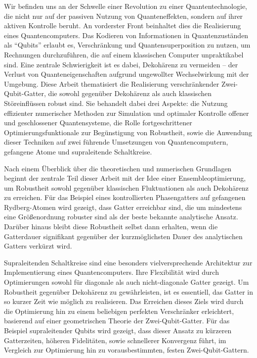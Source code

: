 
Wir befinden uns an der Schwelle einer Revolution zu einer Quantentechnologie,
die nicht nur auf der passiven Nutzung von Quanteneffekten, sondern auf ihrer
aktiven Kontrolle beruht. An vorderster Front beinhaltet dies die Realisierung
eines Quantencomputers. Das Kodieren von Informationen in Quantenzuständen als
``Qubits'' erlaubt es, Verschränkung und Quantensuperposition zu nutzen, um
Rechnungen durchzuführen, die auf einem klassischen Computer unpraktikabel sind.
Eine zentrale Schwierigkeit ist es dabei, Dekohärenz zu vermeiden -- der Verlust
von Quanteneigenschaften aufgrund ungewollter Wechselwirkung mit der Umgebung.
Diese Arbeit thematisiert die Realisierung verschränkender Zwei-Qubit-Gatter,
die sowohl gegenüber Dekohärenz als auch klassischen Störeinflüssen robust sind.
Sie behandelt dabei drei Aspekte: die Nutzung effizienter numerischer Methoden
zur Simulation und optimaler Kontrolle offener und geschlossener
Quantensysteme, die Rolle fortgeschrittener Optimierungsfunktionale zur
Begünstigung von Robustheit, sowie die Anwendung dieser Techniken auf zwei
führende Umsetzungen von Quantencomputern, gefangene Atome und
supraleitende Schaltkreise.

Nach einem Überblick über die theoretischen und numerischen
Grundlagen beginnt der zentrale Teil dieser Arbeit mit der Idee einer
Ensembleoptimierung, um Robustheit sowohl gegenüber klassischen Fluktuationen als
auch Dekohärenz zu erreichen. Für das Beispiel eines kontrollierten
Phasengatters auf gefangenen Rydberg-Atomen wird gezeigt, dass Gatter erreichbar
sind, die um mindestens eine Größenordnung robuster sind als der beste bekannte
analytische Ansatz. Darüber hinaus bleibt diese Ro\/bust\/heit selbst dann
erhalten, wenn die Gatterdauer signifikant gegenüber der kurzmöglichsten Dauer
des analytischen Gatters verkürzt wird.

Supraleitenden Schaltkreise sind eine besonders vielversprechende Architektur
zur Implementierung eines Quantencomputers. Ihre Flexibilität wird durch
Optimierungen sowohl für diagonale als auch nicht-diagonale Gatter gezeigt. Um
Robustheit gegenüber Dekohärenz zu gewährleisten, ist es essentiell, das Gatter
in so kurzer Zeit wie möglich zu realisieren. Das Erreichen dieses Ziels wird
durch die Optimierung hin zu einem beliebigen perfekten Verschränker
erleichtert, basierend auf einer geometrischen Theorie der Zwei-Qubit-Gatter.
Für das Beispiel supraleitender Qubits wird gezeigt, dass dieser Ansatz zu
kürzeren Gatterzeiten, höheren Fidelitäten, sowie schnellerer Konvergenz führt,
im Vergleich zur Optimierung hin zu vorausbestimmten, festen Zwei-Qubit-Gattern.

